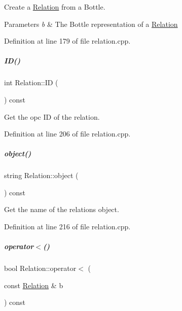Create a \hyperlink{group__icubclient__representations_classicubclient_1_1Relation}{Relation} from a Bottle. 


\begin{DoxyParams}{Parameters}
{\em b} & The Bottle representation of a \hyperlink{group__icubclient__representations_classicubclient_1_1Relation}{Relation} \\
\hline
\end{DoxyParams}


Definition at line 179 of file relation.\+cpp.

\mbox{\label{group__icubclient__representations_ad69f93ae76f642e9c47178789b694b93}} 
\subparagraph{\texorpdfstring{I\+D()}{ID()}}
{\footnotesize\ttfamily int Relation\+::\+ID (\begin{DoxyParamCaption}{ }\end{DoxyParamCaption}) const}



Get the opc ID of the relation. 



Definition at line 206 of file relation.\+cpp.

\mbox{\label{group__icubclient__representations_a701b6174e22c50ce091c321faca34df3}} 
\subparagraph{\texorpdfstring{object()}{object()}}
{\footnotesize\ttfamily string Relation\+::object (\begin{DoxyParamCaption}{ }\end{DoxyParamCaption}) const}



Get the name of the relation\textquotesingle{}s object. 



Definition at line 216 of file relation.\+cpp.

\mbox{\label{group__icubclient__representations_ac84667418f86edca13ed238e5d7472e2}} 
\subparagraph{\texorpdfstring{operator$<$()}{operator<()}}
{\footnotesize\ttfamily bool Relation\+::operator$<$ (\begin{DoxyParamCaption}\item[{const \hyperlink{group__icubclient__representations_classicubclient_1_1Relation}{Relation} \&}]{b }\end{DoxyParamCaption}) const}



